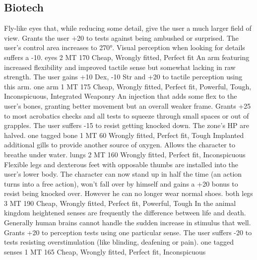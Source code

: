 \subsection{Biotech}
\vspace{10mm}
\begin{multicols}{2}
    {Fly-like eyes that, while reducing some detail, give the user a much larger field of view.}
    {Grants the user +20 to tests against being ambushed or surprised.
        The user's control area increases to 270°.
        Visual perception when looking for details suffers a -10.}
    {eyes}
    {2 MT}
    {170}
    {Cheap, Wrongly fitted, Perfect fit}
    {An arm featuring increased flexibility and improved tactile sense but somewhat lacking in raw strength.}
    {The user gains +10 Dex, -10 Str and +20 to tactile perception using this arm.}
    {one arm}
    {1 MT}
    {175}
    {Cheap, Wrongly fitted, Perfect fit, Powerful, Tough, Inconspicuous, Integrated Weaponry}
    {An injection that adds some flex to the user's bones, granting better movement but an overall weaker frame.}
    {Grants +25 to most acrobatics checks and all tests to squeeze through small spaces or out of grapples.
        The user suffers -15 to resist getting knocked down.
        The zone's HP are halved.}
    {one tagged bone}
    {1 MT}
    {60}
    {Wrongly fitted, Perfect fit, Tough}
    {Implanted additional gills to provide another source of oxygen.}
    {Allows the character to breathe under water.}
    {lungs}
    {2 MT}
    {160}
    {Wrongly fitted, Perfect fit, Inconspicuous}
    {Flexible legs and dexterous feet with opposable thumbs are installed into the user's lower body.}
    {The character can now stand up in half the time (an action turns into a free action),
        won't fall over by himself and gains a +20 bonus to resist being knocked over.
        However he can no longer wear normal shoes.}
    {both legs}
    {3 MT}
    {190}
    {Cheap, Wrongly fitted, Perfect fit, Powerful, Tough}
    {In the animal kingdom heightened senses are frequently the difference between life and death.
        Generally human brains cannot handle the sudden increase in stimulus that well.}
    {Grants +20 to perception tests using one particular sense.
        The user suffers -20 to tests resisting overstimulation (like blinding, deafening or pain).}
    {one tagged senses}
    {1 MT}
    {165}
    {Cheap, Wrongly fitted, Perfect fit, Inconspicuous}

\end{multicols}
